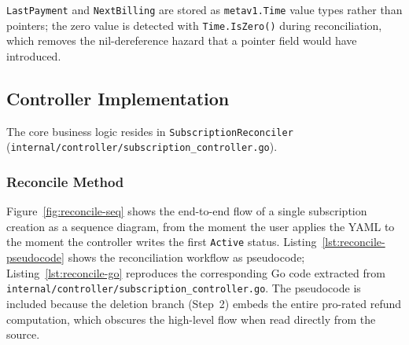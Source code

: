 \texttt{LastPayment} and \texttt{NextBilling} are stored as \texttt{metav1.Time} value types rather than pointers; the zero value is detected with \texttt{Time.IsZero()} during reconciliation, which removes the nil-dereference hazard that a pointer field would have introduced.

\subsection{Controller Implementation}

The core business logic resides in \texttt{SubscriptionReconciler} (\texttt{internal/controller/subscription\_controller.go}).

\subsubsection{Reconcile Method}

Figure~\ref{fig:reconcile-seq} shows the end-to-end flow of a single subscription creation as a sequence diagram, from the moment the user applies the YAML to the moment the controller writes the first \texttt{Active} status. Listing~\ref{lst:reconcile-pseudocode} shows the reconciliation workflow as pseudocode; Listing~\ref{lst:reconcile-go} reproduces the corresponding Go code extracted from \texttt{internal/controller/subscription\_controller.go}. The pseudocode is included because the deletion branch (Step~2) embeds the entire pro-rated refund computation, which obscures the high-level flow when read directly from the source.

